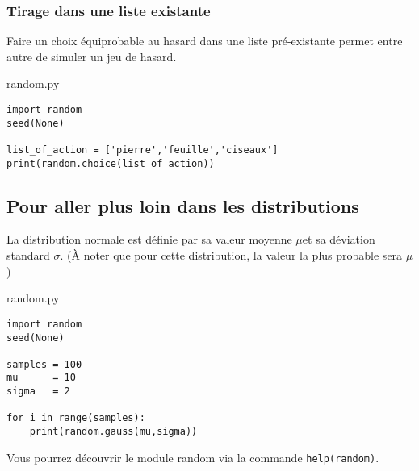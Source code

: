 \subsubsection{Tirage dans une liste existante}


Faire un choix équiprobable au hasard dans une liste pré-existante permet entre autre de simuler un jeu de hasard.



\vskip 2pt
\begin{center}
  \begin{myterminalbox}[colback=gray!10]{random.py}
\begin{verbatim}
import random
seed(None)

list_of_action = ['pierre','feuille','ciseaux']
print(random.choice(list_of_action))
\end{verbatim}
  \end{myterminalbox}
\end{center}





\subsection{Pour aller plus loin dans les distributions}

La distribution normale est définie par sa valeur moyenne $\mu $et sa déviation standard $\sigma$. (À noter que pour cette distribution, la valeur la plus probable sera $\mu$)


\vskip 2pt
\begin{center}
  \begin{myterminalbox}[colback=gray!10]{random.py}
\begin{verbatim}
import random
seed(None)

samples = 100
mu      = 10
sigma   = 2 

for i in range(samples):
    print(random.gauss(mu,sigma))
\end{verbatim}
  \end{myterminalbox}
\end{center}



Vous pourrez découvrir le module random via la commande \texttt{help(random)}.
